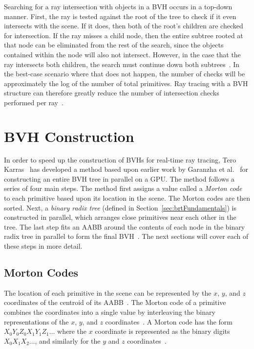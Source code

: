 \documentclass{sig-alternate}
\begin{document}
Searching for a ray intersection with objects in a BVH occurs in a top-down manner. First, the ray is tested against the root of the tree to check if it even intersects with the scene. If it does, then both of the root's children are checked for intersection. If the ray misses a child node, then the entire subtree rooted at that node can be eliminated from the rest of the search, since the objects contained within the node will also not intersect. However, in the case that the ray intersects both children, the search must continue down both subtrees~\cite{Gribble:2012}. In the best-case scenario where that does not happen, the number of checks will be approximately the log of the number of total primitives. Ray tracing with a BVH structure can therefore greatly reduce the number of intersection checks performed per ray~\cite{wiki:bvh}. 

\section{BVH Construction}
\label{sec:bvh}

In order to speed up the construction of BVHs for real-time ray tracing, Tero Karras~\cite{Karras:2012} has developed a method based upon earlier work by Garanzha et al.~\cite{Garanzha:2011} for constructing an entire BVH tree in parallel on a GPU. The method follows a series of four main steps. The method first assigns a value called a \emph{Morton code} to each primitive based upon its location in the scene. The Morton codes are then sorted. Next, a \emph{binary radix tree} (defined in Section~\ref{sec:brtFundamentals}) is constructed in parallel, which arranges close primitives near each other in the tree. The last step fits an AABB around the contents of each node in the binary radix tree in parallel to form the final BVH~\cite{Karras:2012}. The next sections will cover each of these steps in more detail.

\subsection{Morton Codes}
\label{sec:mortonCodes}

The location of each primitive in the scene can be represented by the $x$, $y$, and $z$ coordinates of the centroid of its AABB~\cite{Viitanen:2015, Wald:2007}. The Morton code of a primitive combines the coordinates into a single value by interleaving the binary representations of the $x$, $y$, and $z$ coordinates~\cite{Garanzha:2011}. A Morton code has the form \begin{math}X_{0}Y_{0}Z_{0}X_{1}Y_{1}Z_{1}\dots\end{math} where the $x$ coordinate is represented as the binary digits \begin{math}X_{0}X_{1}X_{2}\dots\end{math}, and similarly for the $y$ and $z$ coordinates~\cite{Karras:2012}.
\end{document}
